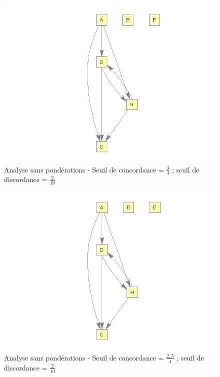 \documentclass[a4paper,10pt]{article}
\begin{document}
\begin{figure}[H]
\begin{center}
\includegraphics[scale=0.3]{img/G3-neutre.jpg}
\caption{Analyse sans pondérations - Seuil de concordance = $\frac{3}{4}$ ; seuil de discordance = $\frac{2}{10}$}
\end{center}
\end{figure}

\begin{figure}[H]
\begin{center}
\includegraphics[scale=0.3]{img/G4-neutre.jpg}
\caption{Analyse sans pondérations - Seuil de concordance = $\frac{2,5}{4}$ ; seuil de discordance = $\frac{2}{10}$}
\end{center}
\end{figure}
\end{document}
